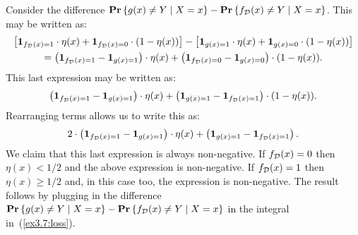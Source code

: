 Consider the difference $\mathbf{Pr} \left \{ g(x) \neq Y \mid X = x \right \} - \mathbf{Pr} \left \{ f_{\mathcal{D}}(x) \neq Y \mid X = x \right \}$.
This may be written as:
\begin{multline*}
\left [ \mathbf{1}_{f_{\mathcal{D}} (x) = 1} \cdot \eta (x)  +
        \mathbf{1}_{f_{\mathcal{D}} (x) = 0} \cdot (1 - \eta (x)) \right ] -
\left [ \mathbf{1}_{g(x) = 1} \cdot \eta (x)  +
        \mathbf{1}_{g(x) = 0} \cdot (1 - \eta (x)) \right ]  \\
  = \left ( \mathbf{1}_{f_{\mathcal{D}} (x) = 1} - \mathbf{1}_{g(x) = 1} \right ) \cdot \eta(x) +
  \left ( \mathbf{1}_{f_{\mathcal{D}} (x) = 0} - \mathbf{1}_{g(x) = 0} \right ) \cdot (1 - \eta(x)).
\end{multline*}
This last expression may be written as:
\[\left ( \mathbf{1}_{f_{\mathcal{D}} (x) = 1} - \mathbf{1}_{g(x) = 1} \right ) \cdot \eta(x) +
  \left ( \mathbf{1}_{g (x) = 1} - \mathbf{1}_{f_{\mathcal{D}} (x) = 1} \right ) \cdot (1 - \eta(x)).
\]
Rearranging terms allows us to write this as:
\begin{equation}
2 \cdot \left ( \mathbf{1}_{f_{\mathcal{D}} (x) = 1} - \mathbf{1}_{g(x) = 1} \right ) \cdot \eta(x) +
  \left ( \mathbf{1}_{g (x) = 1} - \mathbf{1}_{f_{\mathcal{D}} (x) = 1} \right ).
\end{equation}
We claim that this last expression is always non-negative. If $f_{\mathcal{D}} (x) = 0$ then
$\eta (x) < 1/2$ and the above expression is non-negative. If $f_{\mathcal{D}} (x) = 1$ then
$\eta (x) \geq 1/2$ and, in this case too, the expression is non-negative. The result
follows by plugging in the difference
$\mathbf{Pr} \left \{ g(x) \neq Y \mid X = x \right \} - \mathbf{Pr} \left \{ f_{\mathcal{D}}(x) \neq Y \mid X = x \right \}$
in the integral in~(\ref{ex3.7:loss}).





